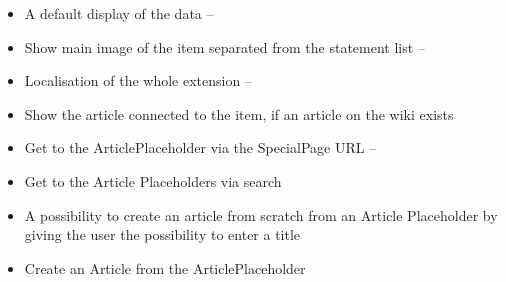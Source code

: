 \documentclass[11pt]{article}
\begin{document}
\begin{itemize}
\item A default display of the data -- 
\item Show main image of the item separated from the statement list -- 
\item Localisation of the whole extension -- 
\item Show the article connected to the item, if an article on the wiki exists
\item Get to the ArticlePlaceholder via the SpecialPage URL --
\item Get to the Article Placeholders via search
\item A possibility to create an article from scratch from an Article Placeholder by giving the user the possibility to enter a title

\item Create an Article from the ArticlePlaceholder
\end{itemize} 
 
\end{document}
